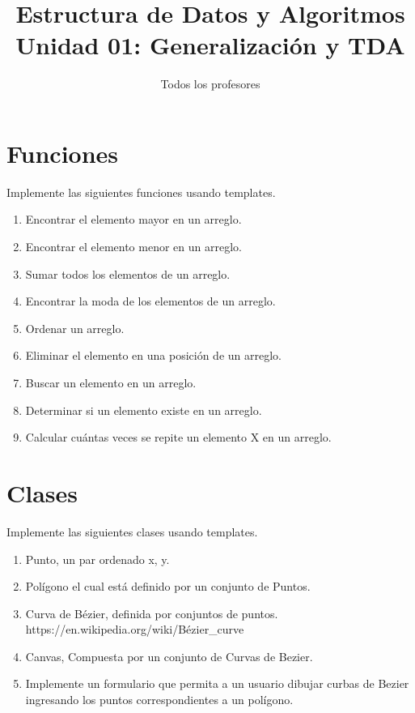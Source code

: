 \documentclass{article}
\title{Estructura de Datos y Algoritmos \\
  \large Unidad 01: Generalización y TDA}
\author{Todos los profesores}
\date{\the\year}
\begin{document}
\maketitle

\section{Funciones}

Implemente las siguientes funciones usando templates.
\begin{enumerate}
\item Encontrar el elemento mayor en un arreglo.
\item Encontrar el elemento menor en un arreglo.
\item Sumar todos los elementos de un arreglo.
\item Encontrar la moda de los elementos de un arreglo.
\item Ordenar un arreglo.
\item Eliminar el elemento en una posición de un arreglo.
\item Buscar un elemento en un arreglo.
\item Determinar si un elemento existe en un arreglo.
\item Calcular cuántas veces se repite un elemento X en un arreglo.
\end{enumerate}

\section{Clases}

Implemente las siguientes clases usando templates.
\begin{enumerate}
\item Punto, un par ordenado x, y.
\item Polígono el cual está definido por un conjunto de Puntos.
\item Curva de Bézier, definida por conjuntos de puntos.
  https://en.wikipedia.org/wiki/Bézier\_curve
\item Canvas, Compuesta por un conjunto de Curvas de Bezier.
\item Implemente un formulario que permita a un usuario dibujar curbas de Bezier ingresando los puntos correspondientes a un polígono.
\end{enumerate}
\end{document}
